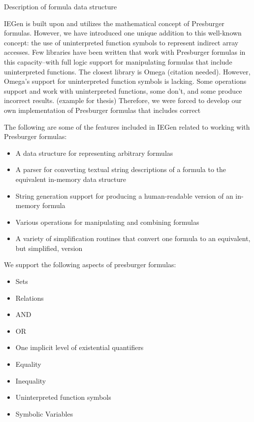 \documentclass[journal,10pt]{IEEEtran}
\begin{document}
\begin{section}{Description of formula data structure}

IEGen is built upon and utilizes the mathematical concept of Presburger formulas.
However, we have introduced one unique addition to this well-known concept: the use of uninterpreted function symbols to represent indirect array accesses.
Few libraries have been written that work with Presburger formulas in this capacity--with full logic support for manipulating formulas that include uninterpreted functions.
The closest library is Omega (citation needed).
However, Omega's support for uninterpreted function symbols is lacking.
Some operations support and work with uninterpreted functions, some don't, and some produce incorrect results. (example for thesis)
Therefore, we were forced to develop our own implementation of Presburger formulas that includes correct 

The following are some of the features included in IEGen related to working with Presburger formulas:

\begin{itemize}
\item A data structure for representing arbitrary formulas
\item A parser for converting textual string descriptions of a formula to the equivalent in-memory data structure
\item String generation support for producing a human-readable version of an in-memory formula
\item Various operations for manipulating and combining formulas
\item A variety of simplification routines that convert one formula to an equivalent, but simplified, version
\end{itemize}

We support the following aspects of presburger formulas:

\begin{itemize}
\item Sets
\item Relations
\item AND
\item OR
\item One implicit level of existential quantifiers
\item Equality
\item Inequality
\item Uninterpreted function symbols
\item Symbolic Variables
\end{itemize}


\end{section}
\end{document}
